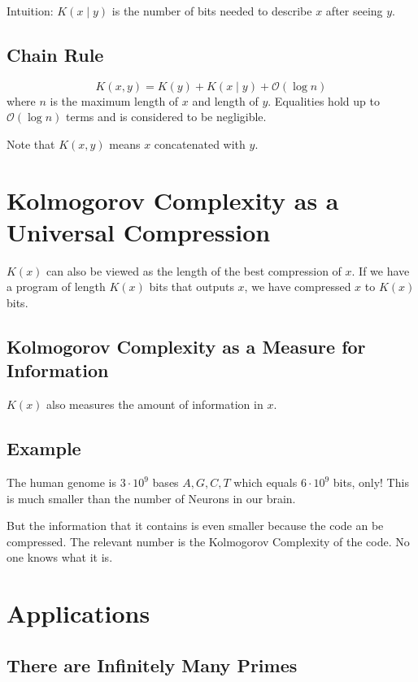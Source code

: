 \documentclass{article}
\begin{document}
Intuition: $K(x\mid y)$ is the number of bits needed to describe $x$ after seeing $y$.

\subsection{Chain Rule}
\[
K(x,y) = K(y) + K(x\mid y) + \mathcal{O}\left(\log n\right)
\]
where $n$ is the maximum length of $x$ and length of $y$. Equalities hold up to $\mathcal{O}\left(\log n\right)$ terms and is considered to be negligible.

Note that $K(x,y)$ means $x$ concatenated with $y$.

\section{Kolmogorov Complexity as a Universal Compression}

$K(x)$ can also be viewed as the length of the best compression of $x$. If we have a program of length $K(x)$ bits that outputs $x$, we have compressed $x$ to $K(x)$ bits.

\subsection{Kolmogorov Complexity as a Measure for Information}

$K(x)$ also measures the amount of information in $x$.

\subsection{Example}

The human genome is $3\cdot 10^9$ bases $A,G,C,T$ which equals $6\cdot 10^9$ bits, only! This is much smaller than the number of Neurons in our brain.

But the information that it contains is even smaller because the code an be compressed. The relevant number is the Kolmogorov Complexity of the code. No one knows what it is.

\section{Applications}

\subsection{There are Infinitely Many Primes}
\end{document}
